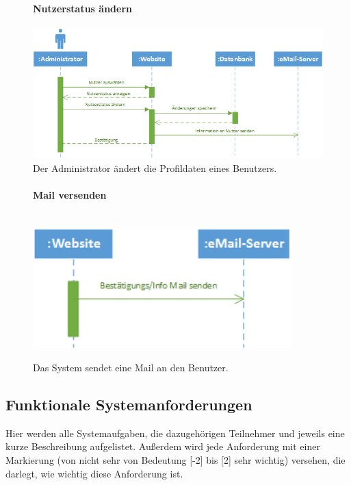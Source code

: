 \documentclass[12pt,a4paper]{article}
\begin{document}
\begin{figure}[H]
	\centering
	\paragraph{Nutzerstatus ändern}
	\includegraphics[width=\textwidth]{Bilder/Sequenzdiagramme/NutzerstatusAendern.png}
	\caption{Der Administrator ändert die Profildaten eines Benutzers.}
	\label{SzNutzerstatusAendern}
\end{figure}

\begin{figure}[H]
	\centering
	\paragraph{Mail versenden}\mbox{}\\
	\includegraphics[width=10cm]{Bilder/Sequenzdiagramme/MailVersenden.png}
	\caption{Das System sendet eine Mail an den Benutzer.}
	\label{SzMailVersenden}
\end{figure}


\subsection{Funktionale Systemanforderungen}
Hier werden alle Systemaufgaben, die dazugehörigen Teilnehmer und jeweils eine kurze Beschreibung aufgelistet. Außerdem wird jede Anforderung mit einer Markierung (von nicht sehr von Bedeutung [-2]  bis [2] sehr wichtig) versehen, die darlegt, wie wichtig diese Anforderung ist.
\end{document}
